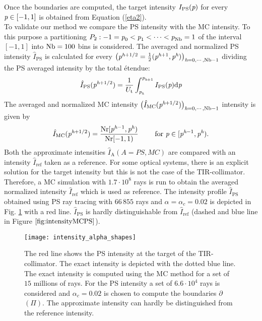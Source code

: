 Once the boundaries are computed, the target intensity $I_{\textrm{PS}}(\textit{p})$ for every $\textit{p}\in[-1,1]$ is obtained from Equation (\ref{eta2}). \\ \indent
To validate our method we compare the PS intensity with the MC intensity. 
To this purpose a partitioning $P_2:-1=\textit{p}_{0}<\textit{p}_1<\cdots<\textit{p}_{\textrm{Nb}}=1$ of the interval $[-1,1]$ into $\textrm{Nb}=100$ bins is considered. 
The averaged and normalized PS intensity $\hat{I}_{\textrm{PS}}$ is calculated for every 
$\big(\textit{p}^{\textit{h}+1/2} = \frac{1}{2}(\textit{p}^{\textit{h}+1}, \textit{p}^{\textit{h}})\big)_{\textit{h}=0, \cdots, \textrm{Nb}-1}$ dividing the PS averaged intensity by the total \'{e}tendue:
\begin{equation}\label{eq:normalized_PS_intensity}
\hat{I}_{\textrm{PS}}(\textit{p}^{\textit{h}+1/2}) = \frac{1}{U_{\textrm{t}}}\int_{\textit{p}_{\textit{h}}}^{\textit{p}_{\textit{h}+1}} I_{\textrm{PS}}(\textit{p})\textrm{d}\textit{p}
\end{equation}
The averaged and normalized MC intensity $\big(\hat{I}_{\textrm{MC}}(\textit{p}^{\textit{h}+1/2})\big)_{\textit{h} = 0, \cdots, \textrm{Nb}-1}$ intensity is given by
\begin{equation}\label{eq:normalized_MC_intensity}
\hat{I}_{\textrm{MC}}(\textit{p}^{\textit{h}+1/2}) = \frac{\textrm{Nr}[\textit{p}^{\textit{h}-1},\textit{p}^{\textit{h}})}{\textrm{Nr} [-1,1)} 
\qquad \mbox{ for } \textit{p}\in[\textit{p}^{\textit{h}-1}, \textit{p}^{\textit{h}}).
\end{equation} 
Both the approximate intensities $\hat{I}_{\textrm{A}} (A = PS, MC)$ are compared with an intensity $\hat{I}_{\textrm{ref}}$ taken as a reference. For some optical systems, there is an explicit solution for the target intensity but this is not the case of the TIR-collimator.
Therefore, a MC simulation with $1.7 \cdot 10^8$ rays is run to obtain the averaged normalized intensity $\hat{I}_{\mbox{ref}}$ which is used as reference.
The intensity profile $\hat{I}_{\textrm{PS}}
$ obtained using PS ray tracing with $66\,855$ rays and $\alpha= \alpha_c = 0.02$ is depicted in Fig. \ref{fig:intensityMCPS} with a red line.
$\hat{I}_{\textrm{PS}}$ is hardly distinguishable from $\hat{I}_{\mbox{ref}}$ (dashed and blue line in Figure $\ref{fig:intensityMCPS}$).\\ \indent
  \begin{figure}[h]
    \centering
    \texttt{[image: intensity\_alpha\_shapes]}
\caption{\footnotesize{The red line shows the PS intensity at the target of the TIR-collimator. The exact intensity is depicted with the dotted blue line.
The exact intensity is computed using the MC method for a set of $15$ millions of rays. For the PS intensity a set of $6.6\cdot 10^4$
rays is considered and $\alpha_c = 0.02$ is chosen to compute the boundaries $\partial$$(\Pi)$. The approximate intensity can hardly be distinguished from the reference intensity.}}
  \label{fig:intensityMCPS}
\end{figure}

